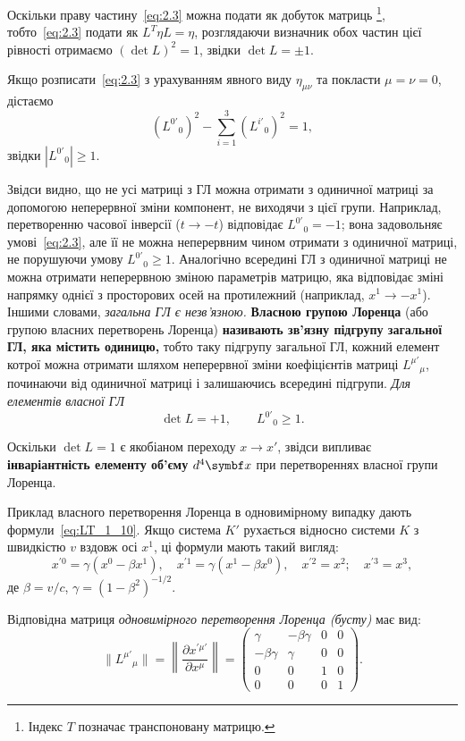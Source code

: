 \documentclass[%
biblatex,
]{ConspectBook}
\begin{document}
Оскільки праву частину~\eqref{eq:2.3} можна подати як добуток матриць%
\footnote{Індекс $T$ позначає транспоновану матрицю.},
тобто~\eqref{eq:2.3} подати як $L^T \eta L = \eta$,
розглядаючи визначник обох частин цієї рівності отримаємо
$(\det L)^2 = 1$, звідки $\det L = \pm 1$.

Якщо розписати~\eqref{eq:2.3} з урахуванням явного виду $\eta_{\mu\nu}$ та
покласти $\mu = \nu = 0$, дістаємо
\[
  (L^{0'}{}_0)^2 - \sum_{i=1}^{3}(L^{i'}{}_0)^2 = 1,
\]
звідки $|L^{0'}{}_0| \geq 1$.

Звідси видно, що не усі матриці з ГЛ можна отримати з одиничної матриці
за допомогою неперервної зміни компонент, не виходячи з цієї групи.
Наприклад, перетворенню часової інверсії ($t \to -t$) відповідає
$L^{0'}{}_0 = -1$; вона задовольняє умові~\eqref{eq:2.3}, але
її не можна неперервним чином отримати з одиничної матриці, не порушуючи
умову $L^{0'}{}_0 \geq 1$. Аналогічно всередині ГЛ з одиничної матриці
не можна отримати неперервною зміною параметрів матрицю, яка відповідає
зміні напрямку однієї з просторових осей на протилежний (наприклад,
$x^1 \to -x^1$). Іншими словами, \textit{загальна ГЛ є незв'язною.}
\textbf{Власною групою Лоренца} (або групою власних перетворень Лоренца)
\textbf{називають зв'язну підгрупу загальної ГЛ, яка містить одиницю,}
тобто таку підгрупу загальної ГЛ, кожний елемент котрої можна отримати
шляхом неперервної зміни коефіцієнтів матриці $L^{\mu'}{}_\mu$,
починаючи від одиничної матриці і залишаючись всередині підгрупи.
\textit{Для елементів власної ГЛ}
\[
  \det L = +1, \qquad L^{0'}{}_0 \geqslant 1.
\]

Оскільки $\det L = 1$ є якобіаном переходу $x \to x'$, звідси випливає
\textbf{інваріантність елементу об'єму} $d^4\vect{x}$ при перетвореннях власної
групи Лоренца.

Приклад власного перетворення Лоренца в одновимірному випадку дають
формули~\eqref{eq:LT_1_10}. Якщо система $K'$ рухається відносно системи $K$ з
швидкістю $v$ вздовж осі $x^1$, ці формули мають такий вигляд:
\[
  x^{\prime 0} = \gamma(x^0 - \beta x^1),\quad
  x^{\prime 1} = \gamma(x^1 - \beta x^0),\quad
  x^{\prime 2} = x^2;\quad
  x^{\prime 3} = x^3,
\]
де $\beta = v/c$, $\gamma = (1-\beta^2)^{-1/2}$.

Відповідна матриця \textit{одновимірного перетворення Лоренца (бусту)} має вид:
\begin{equation}\label{eq:BoostMatrix}
  \|L^{\mu'}{}_\mu\| = \left\|\frac{\partial x^{\prime\mu'}}{\partial x^\mu}\right\| =
  \begin{pmatrix}
    \gamma   & -\beta\gamma & 0 & 0\\
   -\beta\gamma & \gamma   & 0 & 0\\
    0        & 0          & 1 & 0\\
    0        & 0          & 0 & 1
  \end{pmatrix}.
\end{equation}
\end{document}
